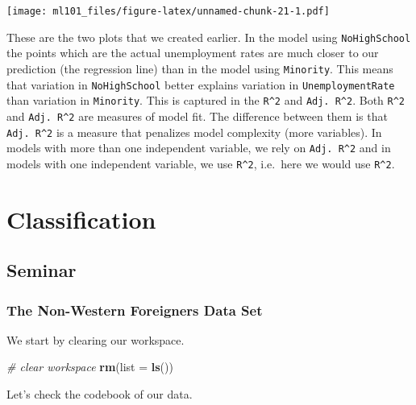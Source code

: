 \documentclass[]{article}
\newenvironment{Shaded}{\begin{snugshade}}{\end{snugshade}}
\newcommand{\CommentTok}[1]{\textcolor[rgb]{0.56,0.35,0.01}{\textit{#1}}}
\newcommand{\DataTypeTok}[1]{\textcolor[rgb]{0.13,0.29,0.53}{#1}}
\newcommand{\KeywordTok}[1]{\textcolor[rgb]{0.13,0.29,0.53}{\textbf{#1}}}
\newcommand{\NormalTok}[1]{#1}
\begin{document}
\texttt{[image: ml101\_files/figure-latex/unnamed-chunk-21-1.pdf]}

These are the two plots that we created earlier. In the model using \texttt{NoHighSchool} the points which are the actual unemployment rates are much closer to our prediction (the regression line) than in the model using \texttt{Minority}. This means that variation in \texttt{NoHighSchool} better explains variation in \texttt{UnemploymentRate} than variation in \texttt{Minority}. This is captured in the \texttt{R\^{}2} and \texttt{Adj.\ R\^{}2}. Both \texttt{R\^{}2} and \texttt{Adj.\ R\^{}2} are measures of model fit. The difference between them is that \texttt{Adj.\ R\^{}2} is a measure that penalizes model complexity (more variables). In models with more than one independent variable, we rely on \texttt{Adj.\ R\^{}2} and in models with one independent variable, we use \texttt{R\^{}2}, i.e.~here we would use \texttt{R\^{}2}.

\hypertarget{classification}{%
\section{Classification}\label{classification}}

\hypertarget{seminar}{%
\subsection{Seminar}\label{seminar}}

\hypertarget{the-non-western-foreigners-data-set}{%
\subsubsection{The Non-Western Foreigners Data Set}\label{the-non-western-foreigners-data-set}}

We start by clearing our workspace.

\begin{Shaded}
\begin{Highlighting}[]
\CommentTok{# clear workspace}
\KeywordTok{rm}\NormalTok{(}\DataTypeTok{list =} \KeywordTok{ls}\NormalTok{())}
\end{Highlighting}
\end{Shaded}

Let's check the codebook of our data.
\end{document}
